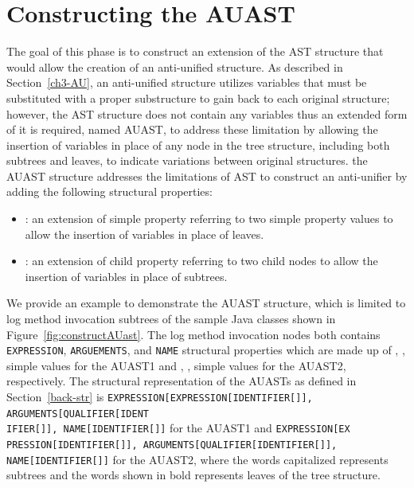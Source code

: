 \section{Constructing the AUAST} \label{meth-constructAUAST}
The goal of this phase is to construct an extension of the AST structure that would allow the creation of an anti-unified structure. 
As described in Section~\ref{ch3-AU}, an anti-unified structure utilizes variables that must be substituted with a proper substructure to gain back to each original structure; however, the AST structure does not contain any variables thus an extended form of it is required, named AUAST, to address these limitation by allowing the insertion of variables in place of any node in the tree structure, including both subtrees and leaves, to indicate variations between original structures. the AUAST structure addresses the limitations of AST to construct an anti-unifier by adding the following structural properties:

\begin{itemize} [leftmargin=.4in]
\item {}: an extension of simple property referring to two simple property values to allow the insertion of variables in place of leaves.
\end{itemize}
\begin{itemize} [leftmargin=.4in]
\item {}: an extension of child property referring to two child nodes to allow the insertion of variables in place of subtrees.

\end{itemize}

We provide an example to demonstrate the AUAST structure, which is limited to log method invocation subtrees of the sample Java classes shown in Figure~\ref{fig:constructAUast}. The log method invocation nodes both contains \texttt{EXPRESSION}, \texttt{ARGUEMENTS}, and \texttt{NAME} structural properties which are made up of \texttt{}, \texttt{}, \texttt{} simple values for the AUAST1 and  \texttt{}, \texttt{}, \texttt{} simple values for the AUAST2, respectively. The structural representation of the AUASTs as defined in Section~\ref{back-str} is \texttt{EXPRESSION[EXPRESSION[IDENTIFIER[]], ARGUMENTS[QUALIFIER[IDENT\\IFIER[]], NAME[IDENTIFIER[]]}
for the AUAST1 and \texttt{EXPRESSION[EX\\PRESSION[IDENTIFIER[]], ARGUMENTS[QUALIFIER[IDENTIFIER[]], \\NAME[IDENTIFIER[]]}
for the AUAST2, where the words capitalized represents subtrees and the words shown in bold represents leaves of the tree structure.


